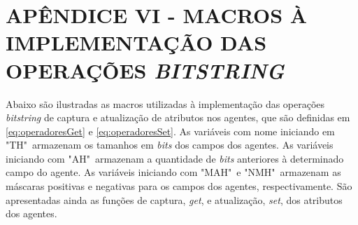 \section{APÊNDICE VI - MACROS À IMPLEMENTAÇÃO DAS OPERAÇÕES \textit{BITSTRING}}

Abaixo são ilustradas as macros utilizadas à implementação das operações \textit{bitstring} de captura e atualização de atributos nos agentes, que são definidas em \ref{eq:operadoresGet} e \ref{eq:operadoresSet}. As variáveis com nome iniciando em "TH"\ armazenam os tamanhos em \textit{bits} dos campos dos agentes. As variáveis iniciando com "AH"\ armazenam a quantidade de \textit{bits} anteriores à determinado campo do agente. As variáveis iniciando com "MAH"\ e "NMH"\ armazenam as máscaras positivas e negativas para os campos dos agentes, respectivamente. São apresentadas ainda as funções de captura, \textit{get}, e atualização, \textit{set}, dos atributos dos agentes. 



\newpage
